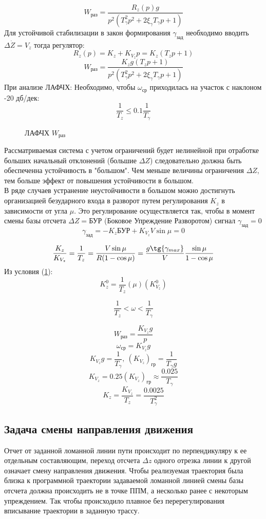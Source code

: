 \documentclass{article}
\begin{document}
\[
	W_\text{раз} = \frac{R_z(p)g}{p^2(T_\gamma^2 p^2 + 2 \xi_\gamma T_\gamma p
		+ 1)}
\]
Для устойчивой стабилизации в закон формирования $\gamma_\text{зад}$ необходимо
вводить $\Delta \dot{Z} = V_{z}$ тогда регулятор:
\[
	R_z(p) = K_z + K_{V_z} p = K_z(T_z p +1)
\]
\[
	W_\text{раз} = \frac{K_z g(T_z p + 1)}{p^2(T_\gamma^2 p^2 + 2 \xi_\gamma
		T_\gamma p + 1)}
\]
При анализе ЛАФЧХ:
Необходимо, чтобы $ \omega_\text{ср}$ приходилась на участок с наклоном -20
дб/дек:
\begin{equation}
	\frac{1}{T_z} \le 0.1 \frac{1}{T_\gamma}
	\label{eq:a2}
\end{equation}

\begin{figure}[H]
	\centering
	\caption{ЛАФЧХ $W_\text{раз}$}
	\label{fig:fig_60}
\end{figure}

Рассматриваемая система с учетом ограничений будет нелинейной при отработке
больших начальный отклонений (большие $\Delta Z$) следовательно должна быть
обеспеченна устойчивость в "большом".
Чем меньше величины ограничения $\Delta Z$, тем больше эффект от повышения
устойчивости в большом.\\
В ряде случаев устранение неустойчивости в большом можно достигнуть
организацией безударного входа в разворот путем регулирования $K_z$ в
зависимости от угла $\mu$.
Это регулирование осуществляется так, чтобы в момент смены базы отсчета $\Delta
	Z = \text{БУР}$ (Боковое Упреждение Разворотом) сигнал $ \gamma_\text{зад} =
	0$
\[
	\gamma_\text{зад} = -K_z \text{БУР} + K_{V_z} V \sin{\mu} = 0
\]

\[
	\frac{K_z}{K_{V_z}} = \frac{1}{T_z} = \frac{V \sin{\mu}}{R( 1 - \cos{\mu})}
	= \frac{g \tg{\gamma_{max}}}{V} \frac{\sin{\mu}}{1 - \cos{\mu}}
\]
Из условия (\ref{fig:fig_60}):
\[
	K_z^0 = \frac{1}{T_z}(\mu)(K_{V_z}^0)
\]

\[
	\frac{1}{T_z} < \omega < \frac{1}{T_\gamma}
\]

\[
	W_\text{раз} = \frac{K_{V_z} g}{p}
\]
\[
	\omega_\text{ср} = K_{V_z} g
\]
\[
	K_{V_z} g = \frac{1}{T_\gamma} , \ (K_{V_z})_\text{гр} = \frac{1}{T_\gamma
		g}
\]
\[
	K_{V_z} = 0.25(K_{V_z})_\text{гр} \approx \frac{0.025}{T_{\gamma}}
\]
\[
	K_z = \frac{K_{V_z}}{T_z} = \frac{0.0025}{T_\gamma^2}
\]

\subsection{Задача смены направления движения}
Отчет от заданной ломанной линии пути происходит по перпендикуляру к ее
отдельным составляющим, переход отсчета $\Delta z$ одного отрезка линии к
другой означает смену направления движения. Чтобы реализуемая траектория была
близка к программной траектории задаваемой ломанной линией смены базы отсчета
должна происходить не в точке ППМ, а несколько ранее с некоторым упреждением.
Так чтобы происходило плавное без перерегулирования вписывание траектории в
заданную трассу.
\end{document}
